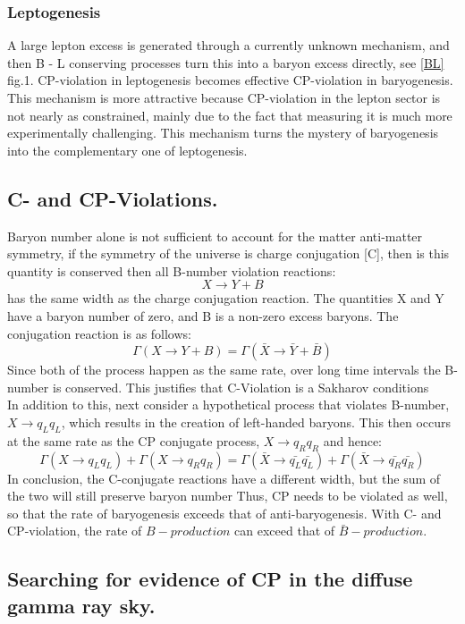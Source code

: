 \subsubsection {Leptogenesis}
A large lepton excess is generated through a currently unknown mechanism, and then B - L conserving processes turn this into a baryon excess directly, see \cref{BL} fig.1. CP-violation in leptogenesis becomes effective CP-violation in baryogenesis. This mechanism is more attractive because CP-violation in the lepton sector is not nearly as constrained, mainly due to the fact that measuring it is much more experimentally challenging. This mechanism turns the mystery of baryogenesis into the complementary one of leptogenesis. \cite{5}
\subsection{C- and CP-Violations.}
Baryon number alone is not sufficient to account for the matter anti-matter symmetry, if the symmetry of the universe is charge conjugation [C], then is this quantity is conserved then all B-number violation reactions: \cite{5}
\begin{equation}
X \rightarrow Y + B
\end{equation}
has the same width as the charge conjugation reaction. The quantities X and Y have a baryon number of zero, and B is a non-zero excess baryons. The conjugation reaction is as follows: 
\begin{equation}
\Gamma (X \rightarrow Y + B) = \Gamma (\bar{X} \rightarrow \bar{Y} + \bar{B})
\end{equation}
Since both of the process happen as the same rate, over long time intervals the B-number is conserved. 
This justifies that C-Violation is a Sakharov conditions\cite{5}\\
In addition to this, next consider a hypothetical process that violates B-number, $X \rightarrow q_{L}q_{L}$, which results in the creation of left-handed baryons. This then occurs at the same rate as the CP conjugate process, $X \rightarrow q_{R}q_{R}$ and hence: 
\begin{equation}
\Gamma (X \rightarrow q_{L}q_{L}) + \Gamma(X \rightarrow  q_{R}q_{R}) = \Gamma (\bar{X} \rightarrow \bar{q_{L}} \bar{q_{L}}) + \Gamma(\bar{X} \rightarrow  \bar{q_{R}} \bar{q_{R}})
\end{equation}
In conclusion, the C-conjugate reactions have a different width, but the sum of the two will still preserve baryon number Thus, CP needs to be violated as well, so that the rate of baryogenesis exceeds that of anti-baryogenesis. With C- and CP-violation, the rate of $B-production$ can exceed that of $\bar{B}-production.$\cite{5} \cite{13}
\begin{center}
\section{Searching for evidence of CP in the diffuse gamma ray sky.}
\end{center}
